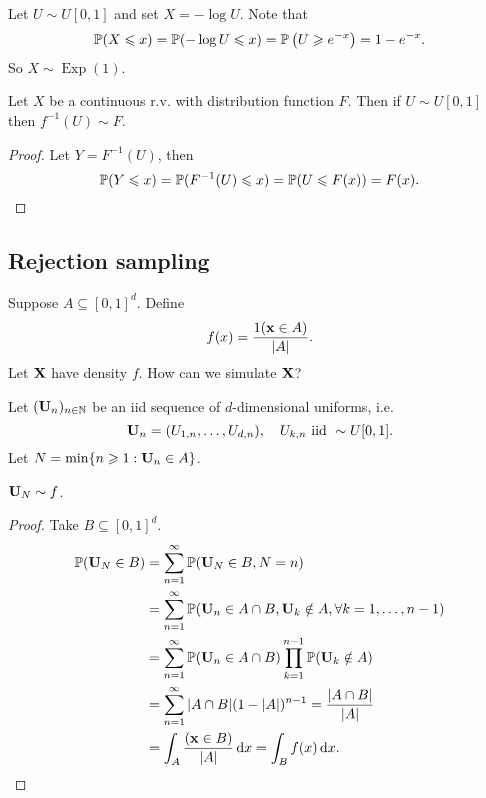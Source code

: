 \begin{example}
    Let $ U \sim U[0,1] $ and set $ X=-\log U $. Note that 
    \[
        \bbP(X \leqslant x)=\bbP(-\log U \leqslant x)=\bbP\left(U \geqslant e^{-x}\right)=1-e^{-x} .
    \]
    So $ X \sim \operatorname{Exp}(1) $.
\end{example}

\begin{theorem}
    Let $X$ be a continuous r.v. with distribution function $F$. Then if $ U \sim U[0,1] $ then $ f^{-1}(U) \sim F $.
\end{theorem}
\begin{proof}
    Let $ Y=F^{-1}(U) $, then 
    \[
        \mathbb{P}(Y\le x) = \mathbb{P}(F^{-1}(U)\le x) = \mathbb{P}(U \le F(x)) = F(x).\qedhere
    \]
\end{proof}

\subsection{Rejection sampling}

Suppose $ A \subseteq [0,1]^d $. Define
\[
    f(x) = \frac{1(\bfx\in A)}{|A|}.
\]
Let $ \bfX $ have density $f$. How can we simulate $\bfX$?

Let $ (\bfU_n)_{n\in \bbN} $ be an iid sequence of $d$-dimensional uniforms, i.e. 
\[
    \bfU_n = (U_{1,n},\dots,U_{d,n}),\quad U_{k,n} \text{ iid } \sim U[0,1].
\]
Let $ N= \min \{n\ge 1: \bfU_n\in A\} $.

\begin{claim}
    $ \bfU_N \sim f $.
\end{claim}
\begin{proof}
    Take $ B \subseteq [0,1]^d $.
    \begin{align*}
        \mathbb{P}(\bfU_N\in B) &= \sum_{n=1}^{\infty }\mathbb{P}(\bfU_N\in B,N=n)\\ 
        &= \sum_{n=1}^{\infty}\mathbb{P}(\bfU_n\in A \cap B,\bfU_{k}\notin A,\forall k=1,\dots,n-1)\\ 
        &= \sum_{n=1}^{\infty}\mathbb{P}(\bfU_n\in A\cap B)\prod_{k=1}^{n-1}\mathbb{P}(\bfU_k\notin A)\\ 
        &= \sum_{n=1}^{\infty}|A \cap B| (1-|A|)^{n-1} = \frac{|A\cap B|}{|A|}\\ 
        &= \int_{A} \frac{(\bfx\in B)}{|A|} \,\mathrm{d}x = \int_{B}f(x) \,\mathrm{d}x.\qedhere
    \end{align*}    
\end{proof}

